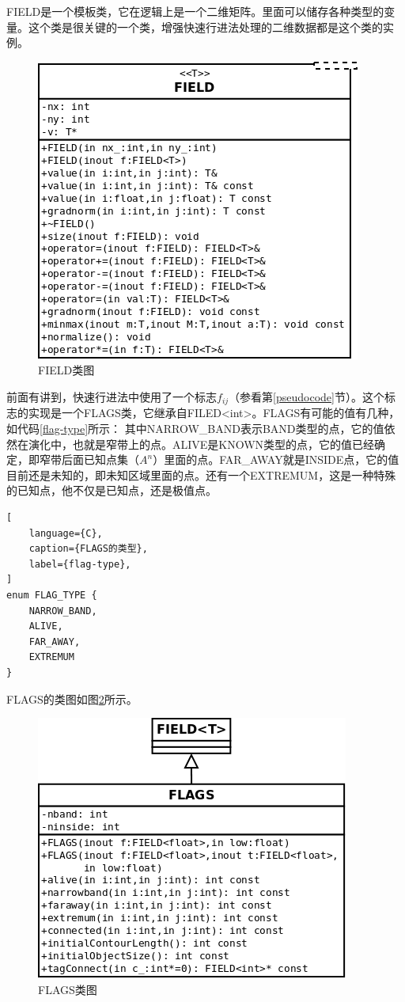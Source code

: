 FIELD是一个模板类，它在逻辑上是一个二维矩阵。里面可以储存各种类型的变量。这个类是很关键的一个类，增强快速行进法处理的二维数据都是这个类的实例。
\begin{figure}[h1]
    \centering
    \includegraphics[width=300bp]{figure/field.png}
    \caption{FIELD类图}
    \label{field_class}
\end{figure}

前面有讲到，快速行进法中使用了一个标志$f_{ij}$（参看第\ref{pseudocode}节）。这个标志的实现是一个FLAGS类，它继承自FILED<int>。FLAGS有可能的值有几种，如代码\ref{flag-type}所示：
其中NARROW\_BAND表示BAND类型的点，它的值依然在演化中，也就是窄带上的点。ALIVE是KNOWN类型的点，它的值已经确定，即窄带后面已知点集（$A^n$）里面的点。FAR\_AWAY就是INSIDE点，它的值目前还是未知的，即未知区域里面的点。还有一个EXTREMUM，这是一种特殊的已知点，他不仅是已知点，还是极值点。
\begin{lstlisting}[
    language={C},
    caption={FLAGS的类型},
    label={flag-type},
]
enum FLAG_TYPE {
    NARROW_BAND,
    ALIVE,
    FAR_AWAY,
    EXTREMUM
}
\end{lstlisting}

FLAGS的类图如图\ref{flags-class}所示。
\begin{figure}[h!]
    \centering
    \includegraphics[width=300bp]{figure/flags.png}
    \caption{FLAGS类图}
    \label{flags-class}
\end{figure}

